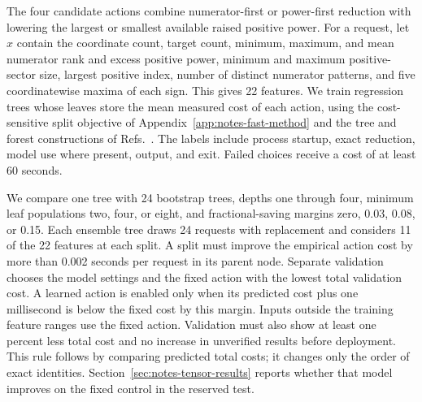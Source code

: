 The four candidate actions combine numerator-first or power-first reduction with lowering the largest or smallest available raised positive power. For a request, let $x$ contain the coordinate count, target count, minimum, maximum, and mean numerator rank and excess positive power, minimum and maximum positive-sector size, largest positive index, number of distinct numerator patterns, and five coordinatewise maxima of each sign. This gives 22 features. We train regression trees whose leaves store the mean measured cost of each action, using the cost-sensitive split objective of Appendix~\ref{app:notes-fast-method} and the tree and forest constructions of Refs.~\cite{CART1984,Breiman2001Forest}. The labels include process startup, exact reduction, model use where present, output, and exit. Failed choices receive a cost of at least 60 seconds.

We compare one tree with 24 bootstrap trees, depths one through four, minimum leaf populations two, four, or eight, and fractional-saving margins zero, 0.03, 0.08, or 0.15. Each ensemble tree draws 24 requests with replacement and considers 11 of the 22 features at each split. A split must improve the empirical action cost by more than 0.002 seconds per request in its parent node. Separate validation chooses the model settings and the fixed action with the lowest total validation cost. A learned action is enabled only when its predicted cost plus one millisecond is below the fixed cost by this margin. Inputs outside the training feature ranges use the fixed action. Validation must also show at least one percent less total cost and no increase in unverified results before deployment. This rule follows by comparing predicted total costs; it changes only the order of exact identities. Section~\ref{sec:notes-tensor-results} reports whether that model improves on the fixed control in the reserved test.

